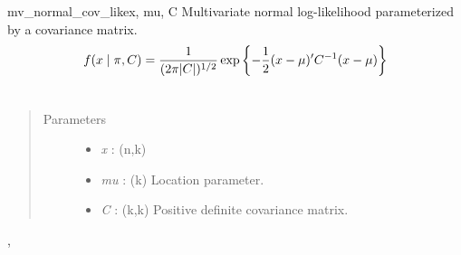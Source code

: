 \hypertarget{pymc.distributions.mv_normal_cov_like}{}\begin{funcdesc}{mv\_normal\_cov\_like}{x, mu, C}
Multivariate normal log-likelihood parameterized by a covariance 
matrix.
\begin{gather}
\begin{split}f(x \mid \pi, C) = \frac{1}{(2\pi|C|)^{1/2}} \exp\left\{ -\frac{1}{2} (x-\mu)^{\prime}C^{-1}(x-\mu) \right\}\end{split}\notag\\\begin{split}\end{split}\notag
\end{gather}\begin{quote}\begin{description}
\item[Parameters] \leavevmode\begin{itemize}
\item {} 
\emph{x} : (n,k)

\item {} 
\emph{mu} : (k) Location parameter.

\item {} 
\emph{C} : (k,k) Positive definite covariance matrix.

\end{itemize}

\end{description}\end{quote}




\hyperlink{pymc.distributions.mv_normal_like}{}, \hyperlink{pymc.distributions.mv_normal_chol_like}{}


\end{funcdesc}

